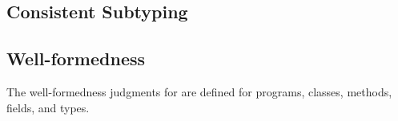 \documentclass[acmlarge, anonymous, authordraft]{acmart}
\begin{document}
\subsection{Consistent Subtyping}

\begin{mathpar}


\end{mathpar}

\begin{mathpar}
\end{mathpar}

\subsection{Well-formedness}

The well-formedness judgments for \kafka are defined for programs, classes, methods, fields, and types.

~\\


\begin{mathpar}
\end{mathpar}


\begin{mathpar}
\end{mathpar}
\end{document}
